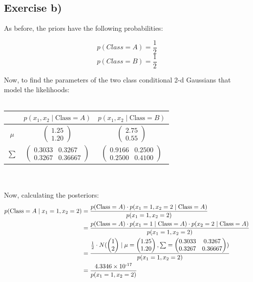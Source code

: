 \documentclass{article}
\begin{document}
\subsection{Exercise b)}
As before, the priors have the following probabilities:

$$p(Class = A) = \frac{1}{2}$$
$$p(Class = B) = \frac{1}{2}$$

Now, to find the parameters of the two class conditional 2-d Gaussians that model the likelihoods:
\\
\\
\begin{tabular}{|c|c|c|}
    \hline
    & \( p(x_1, x_2 \mid \text{Class} = A) \) & \( p(x_1, x_2 \mid \text{Class} = B) \) \\ 
    \hline
    \( \mu \) & $\begin{pmatrix} 1.25 \\ 1.20 \end{pmatrix}$ & $\begin{pmatrix} 2.75 \\  0.55 \end{pmatrix}$ \\
    \hline
    \( \sum \) & $\begin{pmatrix} 0.3033 & 0.3267 \\ 0.3267 & 0.36667 \end{pmatrix}$ & $\begin{pmatrix} 0.9166 & 0.2500 \\ 0.2500 & 0.4100 \end{pmatrix}$ \\
    \hline
\end{tabular}
\\
\\
Now, calculating the posteriors:
\begin{align*}
    p(\text{Class} = A \mid x_1 = 1, x_2 = 2) 
    &= \frac{p(\text{Class} = A) \cdot p(x_1 = 1, x_2 = 2 \mid \text{Class} = A)}{p(x_1 = 1, x_2 = 2)} \\
    &= \frac{p(\text{Class} = A) \cdot p(x_1 = 1 \mid \text{Class} = A) \cdot p(x_2 = 2 \mid \text{Class} = A)}{p(x_1 = 1, x_2 = 2)} \\
    &= \frac{\frac{1}{2} \cdot N(
        \begin{pmatrix}1 \\ 2\end{pmatrix} \mid
        \mu = \begin{pmatrix}1.25 \\ 1.20\end{pmatrix},
        \sum = \begin{pmatrix}0.3033 & 0.3267 \\ 0.3267 & 0.36667 \end{pmatrix}
    )}{p(x_1 = 1, x_2 = 2)} \\
    &= \frac{4.3346 \times 10\textsuperscript{-17}}{p(x_1 = 1, x_2 = 2)}
\end{align*}
\end{document}
